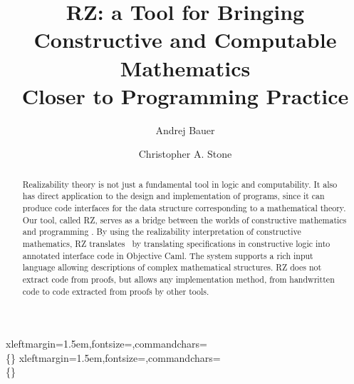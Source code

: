 \usepackage{amsmath}
\usepackage{amssymb}
\usepackage{graphicx}
\usepackage{fancyvrb}
\usepackage{url}




%

\iflong
\newcommand{\sourcefile}[1]{%
\VerbatimInput[xleftmargin=1.5em,fontsize=\footnotesize]{#1}}
\else %
\newcommand{\sourcefile}[1]{%
\VerbatimInput[xleftmargin=1.5em,fontsize=\footnotesize]{#1}}
\fi %

\newcommand{\sourcefilex}[1]{%
\VerbatimInput[xleftmargin=1.5em,fontsize=\scriptsize]{#1}}

\iflong
{}%
{xleftmargin=1.5em,fontsize=\footnotesize,commandchars=\\\{\}}
\else
{}%
{xleftmargin=1.5em,fontsize=\footnotesize,commandchars=\\\{\}}
\fi




\title{RZ: a Tool for Bringing\\
  Constructive and Computable Mathematics\\
  Closer to Programming Practice}
\author{
  Andrej Bauer \and
  Christopher A. Stone}

\maketitle

\begin{abstract}
  Realizability theory 
\iflong 
  is not just a fundamental tool in logic
  and computability.  It also 
  has direct application to the design and
  implementation of programs, since it
\fi %
  can produce code interfaces for the data
  structure corresponding to a
  mathematical theory.
%
  Our tool, called RZ,
  serves as a bridge between
\iflong the worlds of \fi
  constructive
  mathematics and programming%
\iflong 
.
By using the realizability
  interpretation of constructive mathematics, RZ 
  translates
\else
\ by translating
\fi %
  specifications in constructive logic into annotated
  interface code in Objective Caml.
%
  The system supports
  a rich input language allowing descriptions of
  complex mathematical structures. RZ does not extract code from
  proofs, but allows any implementation method, from handwritten code to code extracted from
  proofs by other tools.
\end{abstract}

